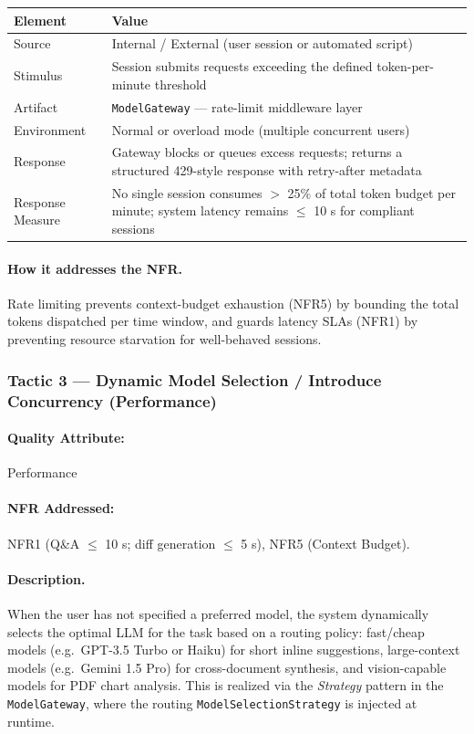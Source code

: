 \documentclass[12pt,a4paper]{article}
\begin{document}
\begin{center}
\begin{tabular}{@{}L{3.5cm}L{9cm}@{}}
\toprule
\textbf{Element} & \textbf{Value} \\
\midrule
Source & Internal / External (user session or automated script) \\
Stimulus & Session submits requests exceeding the defined token-per-minute threshold \\
Artifact & \texttt{ModelGateway} --- rate-limit middleware layer \\
Environment & Normal or overload mode (multiple concurrent users) \\
Response & Gateway blocks or queues excess requests; returns a structured 429-style response with retry-after metadata \\
Response Measure & No single session consumes $>$ 25\% of total token budget per minute; system latency remains $\leq$ 10 s for compliant sessions \\
\bottomrule
\end{tabular}
\end{center}

\paragraph{How it addresses the NFR.}
Rate limiting prevents context-budget exhaustion (NFR5) by bounding the total tokens dispatched
per time window, and guards latency SLAs (NFR1) by preventing resource starvation for well-behaved
sessions.

\subsubsection{Tactic 3 --- Dynamic Model Selection / Introduce Concurrency (Performance)}

\paragraph{Quality Attribute:} Performance

\paragraph{NFR Addressed:} NFR1 (Q\&A $\leq$ 10 s; diff generation $\leq$ 5 s), NFR5 (Context Budget).

\paragraph{Description.}
When the user has not specified a preferred model, the system dynamically selects the optimal LLM
for the task based on a routing policy: fast/cheap models (e.g.\ GPT-3.5 Turbo or Haiku) for
short inline suggestions, large-context models (e.g.\ Gemini 1.5 Pro) for cross-document synthesis,
and vision-capable models for PDF chart analysis. This is realized via the \textit{Strategy}
pattern in the \texttt{ModelGateway}, where the routing \texttt{ModelSelectionStrategy} is
injected at runtime.
\end{document}
